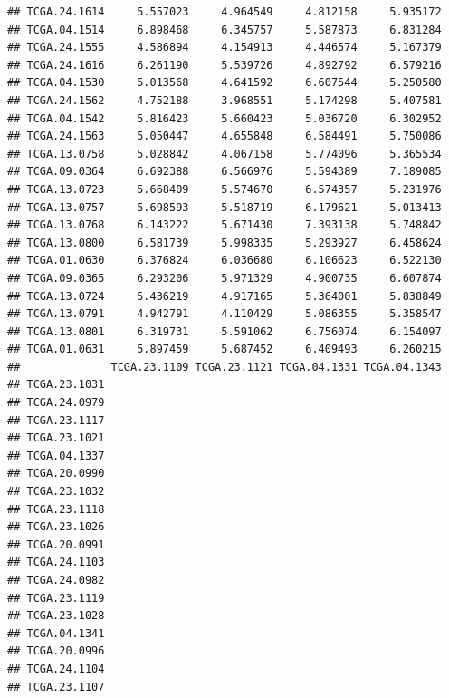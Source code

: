 \documentclass[UTF8]{beamer}\usepackage[]{graphicx}\usepackage[]{color}
\makeatletter
\newenvironment{kframe}{%
 \def\at@end@of@kframe{}%
 \ifinner\ifhmode%
  \def\at@end@of@kframe{\end{minipage}}%
  \begin{minipage}{\columnwidth}%
 \fi\fi%
 \def\FrameCommand##1{\hskip\@totalleftmargin \hskip-\fboxsep
 \colorbox{shadecolor}{##1}\hskip-\fboxsep
     \hskip-\linewidth \hskip-\@totalleftmargin \hskip\columnwidth}%
 \MakeFramed {\advance\hsize-\width
   \@totalleftmargin\z@ \linewidth\hsize
   \@setminipage}}%
 {\par\unskip\endMakeFramed%
 \at@end@of@kframe}
\newenvironment{knitrout}{}{} %
\makeatother
\begin{document}
\begin{frame}[fragile]
\begin{knitrout}
\begin{kframe}
\begin{verbatim}
## TCGA.24.1614     5.557023     4.964549     4.812158     5.935172
## TCGA.04.1514     6.898468     6.345757     5.587873     6.831284
## TCGA.24.1555     4.586894     4.154913     4.446574     5.167379
## TCGA.24.1616     6.261190     5.539726     4.892792     6.579216
## TCGA.04.1530     5.013568     4.641592     6.607544     5.250580
## TCGA.24.1562     4.752188     3.968551     5.174298     5.407581
## TCGA.04.1542     5.816423     5.660423     5.036720     6.302952
## TCGA.24.1563     5.050447     4.655848     6.584491     5.750086
## TCGA.13.0758     5.028842     4.067158     5.774096     5.365534
## TCGA.09.0364     6.692388     6.566976     5.594389     7.189085
## TCGA.13.0723     5.668409     5.574670     6.574357     5.231976
## TCGA.13.0757     5.698593     5.518719     6.179621     5.013413
## TCGA.13.0768     6.143222     5.671430     7.393138     5.748842
## TCGA.13.0800     6.581739     5.998335     5.293927     6.458624
## TCGA.01.0630     6.376824     6.036680     6.106623     6.522130
## TCGA.09.0365     6.293206     5.971329     4.900735     6.607874
## TCGA.13.0724     5.436219     4.917165     5.364001     5.838849
## TCGA.13.0791     4.942791     4.110429     5.086355     5.358547
## TCGA.13.0801     6.319731     5.591062     6.756074     6.154097
## TCGA.01.0631     5.897459     5.687452     6.409493     6.260215
##              TCGA.23.1109 TCGA.23.1121 TCGA.04.1331 TCGA.04.1343
## TCGA.23.1031                                                    
## TCGA.24.0979                                                    
## TCGA.23.1117                                                    
## TCGA.23.1021                                                    
## TCGA.04.1337                                                    
## TCGA.20.0990                                                    
## TCGA.23.1032                                                    
## TCGA.23.1118                                                    
## TCGA.23.1026                                                    
## TCGA.20.0991                                                    
## TCGA.24.1103                                                    
## TCGA.24.0982                                                    
## TCGA.23.1119                                                    
## TCGA.23.1028                                                    
## TCGA.04.1341                                                    
## TCGA.20.0996                                                    
## TCGA.24.1104                                                    
## TCGA.23.1107                                                    

\end{verbatim}
\end{kframe}
\end{knitrout}
\end{frame}
\end{document}

